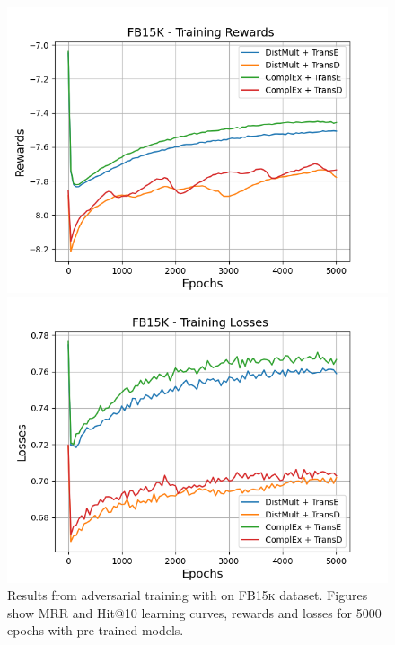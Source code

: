 \begin{figure}[H]
    \begin{minipage}{.5\textwidth}
      \centering
      \includegraphics[width=\linewidth]{figures/results/gan_train/pretrained/random/fb15k/random_fb15k_rew.png}
    \end{minipage}%
     \begin{minipage}{.5\textwidth}
      \centering
      \includegraphics[width=\linewidth]{figures/results/gan_train/pretrained/random/fb15k/random_fb15k_losses.png}
    \end{minipage}%
    \caption{Results from adversarial training with \origsampling on \textsc{FB15k} dataset.
    Figures show MRR and Hit@10 learning curves, rewards and losses for 5000 epochs with pre-trained models.}
    \label{fig:gan_train_pretrained_random_fb15k}
\end{figure}
